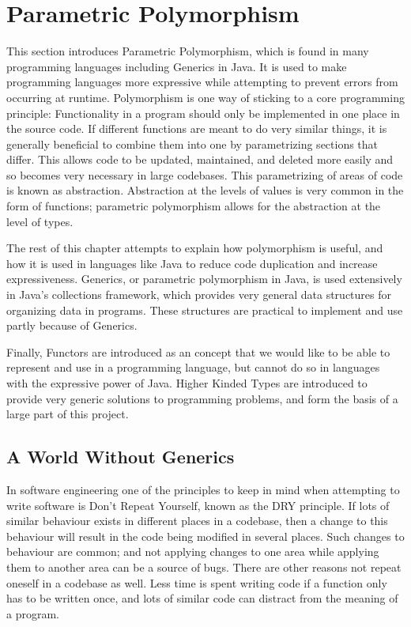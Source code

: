 \chapter{Parametric Polymorphism}\label{sec:poly}
This section introduces Parametric Polymorphism, which is found in many
programming languages including Generics in Java. It is used to make
programming languages more expressive while attempting to prevent errors from
occurring at runtime.  Polymorphism is one way of sticking to a core
programming principle: Functionality in a program should only be implemented in
one place in the source code. If different functions are meant to do very
similar things, it is generally beneficial to combine them into one by
parametrizing sections that differ. This allows code to be updated, maintained,
and deleted more easily and so becomes very necessary in large codebases.  This
parametrizing of areas of code is known as abstraction. Abstraction at the
levels of values is very common in the form of functions; parametric
polymorphism allows for the abstraction at the level of types.

The rest of this chapter attempts to explain how polymorphism is useful, and
how it is used in languages like Java to reduce code duplication and increase
expressiveness. Generics, or parametric polymorphism in Java, is used
extensively in Java's collections framework, which provides very general data
structures for organizing data in programs. These structures are practical to
implement and use partly because of Generics.

Finally, Functors are introduced as an concept that we would like to be able to
represent and use in a programming language, but cannot do so in languages with
the expressive power of Java. Higher Kinded Types are introduced to provide
very generic solutions to programming problems, and form the basis of a large
part of this project.

\section{A World Without Generics}\label{sec:nopoly}
In software engineering one of the principles to keep in mind when attempting
to write software is Don't Repeat Yourself, known as the DRY principle. If lots
of similar behaviour exists in different places in a codebase, then a change to
this behaviour will result in the code being modified in several places.  Such
changes to behaviour are common; and not applying changes to one area while
applying them to another area can be a source of bugs. There are other reasons
not repeat oneself in a codebase as well. Less time is spent writing code if a
function only has to be written once, and lots of similar code can distract
from the meaning of a program.

